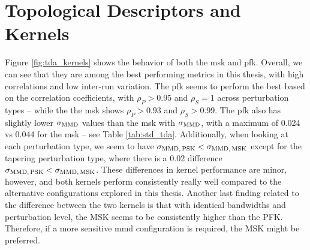 \begin{table}
  \centering
  \caption[$\sigma_\MMD$ values for the \gls{mmd} using the ESM learned
embedding.]{$\sigma_\MMD$ values for the \gls{mmd} using the ESM learned embedding.
$\sigma_\MMD>0.1$ are in bold. These findings corroborate the correlation
coefficients shown in Figure \ref{fig:esm_descriptor}: using a linear kernel or
an RBF kernel with$\sigma<0.1$, we get $\sigma_\MMD<0.1$, we obtain higher
quality (here, more robust) metrics, since $\sigma_\MMD$ is relatively low.}
  \label{tab:std_esm}
\end{table}

\clearpage

\section{Topological Descriptors and Kernels}\label{sec:results_topo_kernels}

Figure \ref{fig:tda_kernels} shows the behavior of both the \gls{msk}
and \gls{pfk}. Overall, we can see that they are among the best
performing metrics in this thesis, with high correlations and low inter-run
variation. The \gls{pfk} seems to perform the best based on the
correlation coefficients, with $\rho_P>0.95$ and $\rho_S=1$ across perturbation
types -- while the the \gls{msk} shows $\rho_P>0.93$ and $\rho_S>0.99$.
The \gls{pfk} also has slightly lower $\sigma_\MMD$ values than
the \gls{msk} with $\sigma_\MMD$, with a maximum of 0.024 vs 0.044 for
the \gls{msk} -- see Table \ref{tab:std_tda}. Additionally, when
looking at each perturbation type, we seem to have $\sigma_{\text{MMD}
  ,\,\text{PSK}}<\sigma_{\text{MMD},\,\text{MSK}}$ except for the tapering
perturbation type, where there is a 0.02 difference $\sigma_{\text{MMD}
,\,\text{PSK}}<\sigma_{\text{MMD},\,\text{MSK}}$. These differences in kernel
performance are minor, however, and both kernels perform consistently really
well compared to the alternative configurations explored in this thesis. Another
last finding related to the difference between the two kernels is that with
identical bandwidths and perturbation level, the MSK seems to be consistently
higher than the PFK. Therefore, if a more sensitive \gls{mmd} configuration is
required, the MSK might be preferred.

